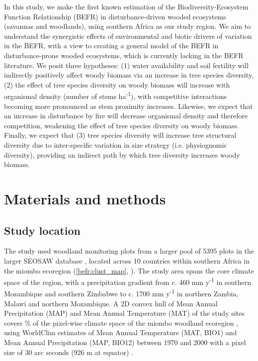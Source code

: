 \begin{refsection}
In this study, we make the first known estimation of the Biodiversity-Ecosystem Function Relationship (BEFR) in disturbance-driven wooded ecosystems (savannas and woodlands), using southern Africa as our study region. We aim to understand the synergistic effects of environmental and biotic drivers of variation in the BEFR, with a view to creating a general model of the BEFR in disturbance-prone wooded ecosystems, which is currently lacking in the BEFR literature. We posit three hypotheses: (1) water availability and soil fertility will indirectly positively affect woody biomass via an increase in tree species diversity, (2) the effect of tree species diversity on woody biomass will increase with organismal density (number of stems ha\textsuperscript{-1}), with competitive interactions becoming more pronounced as stem proximity increases. Likewise, we expect that an increase in disturbance by fire will decrease organismal density and therefore competition, weakening the effect of tree species diversity on woody biomass. Finally, we expect that (3) tree species diversity will increase tree structural diversity due to inter-specific variation in size strategy (i.e. physiognomic diversity), providing an indirect path by which tree diversity increases woody biomass.

\section{Materials and methods}
\label{befr:sec:methods}

\subsection{Study location}
\label{befr:ssec:location}

The study used \nplots{} woodland monitoring plots from a larger pool of 5395 plots in the larger SEOSAW database \citep{SEOSAW2020}, located across 10 countries within southern Africa in the miombo ecoregion (\autoref{befr:clust_map}, \citealp{White1983}). The study area spans the core climate space of the region, with a precipitation gradient from c. 460 mm y\textsuperscript{-1} in southern Mozambique and southern Zimbabwe to c. 1700 mm y\textsuperscript{-1} in northern Zambia, Malawi and northern Mozambique. A 2D convex hull of Mean Annual Precipitation (MAP) and Mean Annual Temperature (MAT) of the study sites covers \hullcover{}\% of the pixel-wise climate space of the miombo woodland ecoregion \citep{White1983}, using WorldClim estimates of Mean Annual Temperature (MAT, BIO1) and Mean Annual Precipitation (MAP, BIO12) between 1970 and 2000 with a pixel size of 30 arc seconds (926 m at equator) \citep{Fick2017}. 


\end{refsection}
